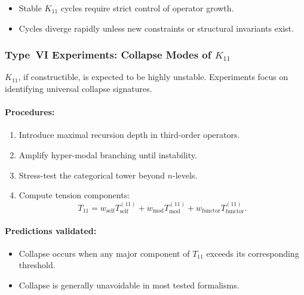 \begin{itemize}
    \item Stable $K_{11}$ cycles require strict control of 
          operator growth.
    \item Cycles diverge rapidly unless new constraints or 
          structural invariants exist.
\end{itemize}



\subsubsection{Type~VI Experiments: Collapse Modes of $K_{11}$}

$K_{11}$, if constructible, is expected to be highly unstable.  
Experiments focus on identifying universal collapse signatures.

\paragraph{Procedures:}

\begin{enumerate}
    \item Introduce maximal recursion depth in third-order operators.
    \item Amplify hyper-modal branching until instability.
    \item Stress-test the categorical tower beyond $n$-levels.
    \item Compute tension components:
          \[
              T_{11} =
                w_{\mathrm{self}} T_{\mathrm{self}}^{(11)}
              + w_{\mathrm{mod}} T_{\mathrm{mod}}^{(11)}
              + w_{\mathrm{functor}} T_{\mathrm{functor}}^{(11)}.
          \]
\end{enumerate}

\paragraph{Predictions validated:}

\begin{itemize}
    \item Collapse occurs when any major component of $T_{11}$ exceeds 
          its corresponding threshold.
    \item Collapse is generally unavoidable in most tested formalisms.
\end{itemize}



